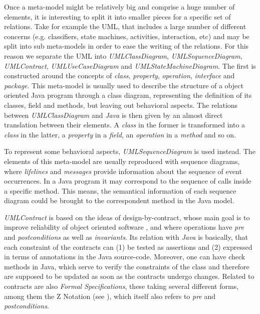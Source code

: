 \documentclass[tuberlin,cic,tc,english,noabntcite]{iiufrgs}
\begin{document}
Once a meta-model might be relatively big and comprise a huge number of elements, it is interesting to split it into smaller pieces for a specific set of relations. Take for example the UML, that includes a large number of different concerns (e.g. classifiers, state machines, activities, interaction, etc) and may be split into sub meta-models in order to ease the writing of the relations. For this reason we separate the UML into \emph{UMLClassDiagram}, \emph{UMLSequenceDiagram}, \emph{UMLContract}, \emph{UMLUseCaseDiagram} and \emph{UMLStateMachineDiagram}. The first is constructed around the concepts of \emph{class}, \emph{property}, \emph{operation}, \emph{interface} and \emph{package}. This meta-model is usually used to describe the structure of a object oriented Java program through a class diagram, representing the definition of its classes, field and methods, but leaving out behavioral aspects. The relations between \emph{UMLClassDiagram} and \emph{Java} is then given by an almost direct translation between their elements. A \emph{class} in the former is transformed into a \emph{class} in the latter, a \emph{property} in a \emph{field}, an \emph{operation} in a \emph{method} and so on.

To represent some behavioral aspects, \emph{UMLSequenceDiagram} is used instead. The elements of this meta-model are usually reproduced with sequence diagrams, where \emph{lifelines} and \emph{messages} provide information about the sequence of event occurrences. In a Java program it may correspond to the sequence of calls inside a specific method. This means, the semantical information of each sequence diagram could be brought to the correspondent method in the Java model.

\emph{UMLContract} is based on the ideas of design-by-contract, whose main goal is to improve reliability of object oriented software \citep{meyer1992applying}, and where operations have \emph{pre} and \emph{postconditions} as well as \emph{invariants}. Its relation with \emph{Java} is basically, that each constraint of the contracts can (1) be tested as assertions and (2) expressed in terms of annotations in the Java source-code. Moreover, one can have check methods in Java, which serve to verify the constraints of the class and therefore are supposed to be updated as soon as the contracts undergo changes. Related to contracts are also \emph{Formal Specifications}, these taking several different forms, among them the Z Notation (see \citep{spivey1992z}), which itself also refers to \emph{pre} and \emph{postconditions}.
\end{document}
